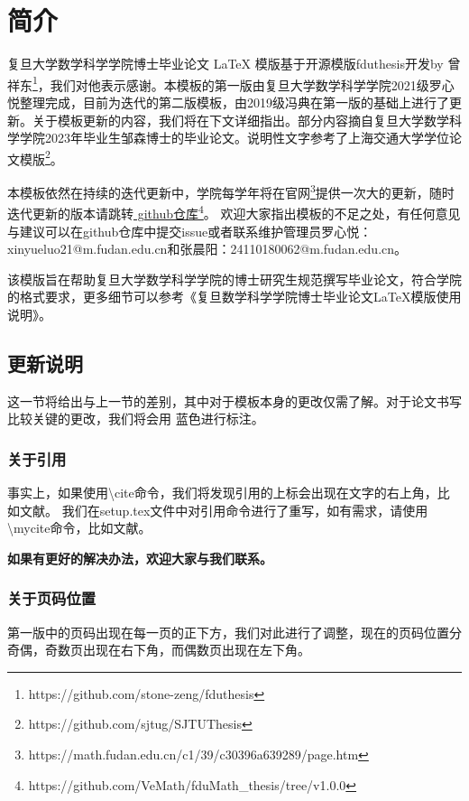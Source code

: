 \chapter{简介}
复旦大学数学科学学院博士毕业论文 LaTeX 模版基于开源模版fduthesis开发by 曾祥东\footnote{https://github.com/stone-zeng/fduthesis}，我们对他表示感谢。本模板的第一版由复旦大学数学科学学院2021级罗心悦整理完成，目前为迭代的第二版模板，由2019级冯典在第一版的基础上进行了更新。关于模板更新的内容，我们将在下文详细指出。部分内容摘自复旦大学数学科学学院2023年毕业生邹森博士的毕业论文。说明性文字参考了上海交通大学学位论文模版\footnote{https://github.com/sjtug/SJTUThesis}。 

本模板依然在持续的迭代更新中，学院每学年将在官网\footnote{https://math.fudan.edu.cn/c1/39/c30396a639289/page.htm}提供一次大的更新，随时迭代更新的版本请跳转\href{https://github.com/VeMath/fduMath_thesis/tree/v1.0.0}{{\color{red} github仓库}}\footnote{https://github.com/VeMath/fduMath\_thesis/tree/v1.0.0}。
欢迎大家指出模板的不足之处，有任何意见与建议可以在github仓库中提交issue或者联系维护管理员罗心悦：xinyueluo21@m.fudan.edu.cn和张晨阳：24110180062@m.fudan.edu.cn。


该模版旨在帮助复旦大学数学科学学院的博士研究生规范撰写毕业论文，符合学院的格式要求，更多细节可以参考《复旦数学科学学院博士毕业论文\LaTeX{}模版使用说明》。

\section{更新说明}
这一节将给出与上一节的差别，其中对于模板本身的更改仅需了解。对于论文书写比较关键的更改，我们将会用{\color{blue} 蓝色}进行标注。
\subsection{关于引用}

事实上，如果使用\textbackslash cite命令，我们将发现引用的上标会出现在文字的右上角，比如文献\cite{ChenPDE}。{\color{blue} 我们在setup.tex文件中对引用命令进行了重写，如有需求，请使用\textbackslash mycite命令，比如文献。}

\textbf{如果有更好的解决办法，欢迎大家与我们联系。}

\subsection{关于页码位置}

第一版中的页码出现在每一页的正下方，我们对此进行了调整，现在的页码位置分奇偶，奇数页出现在右下角，而偶数页出现在左下角。

